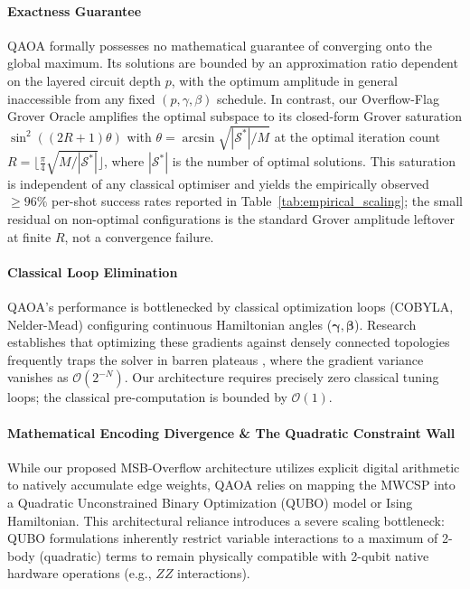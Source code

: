 \documentclass{ieeeaccess}
\begin{document}
\paragraph{Exactness Guarantee}
QAOA formally possesses no mathematical guarantee of converging onto the global maximum. Its solutions are bounded by an approximation ratio dependent on the layered circuit depth $p$, with the optimum amplitude in general inaccessible from any fixed $(p, \gamma, \beta)$ schedule. In contrast, our Overflow-Flag Grover Oracle amplifies the optimal subspace to its closed-form Grover saturation $\sin^2((2R{+}1)\theta)$ with $\theta = \arcsin\sqrt{|\mathcal{S}^*|/M}$ at the optimal iteration count $R = \lfloor \frac{\pi}{4}\sqrt{M / |\mathcal{S}^*|} \rfloor$, where $|\mathcal{S}^*|$ is the number of optimal solutions. This saturation is independent of any classical optimiser and yields the empirically observed $\ge 96\%$ per-shot success rates reported in Table~\ref{tab:empirical_scaling}; the small residual on non-optimal configurations is the standard Grover amplitude leftover at finite $R$, not a convergence failure.

\paragraph{Classical Loop Elimination}
QAOA's performance is bottlenecked by classical optimization loops (COBYLA, Nelder-Mead) configuring continuous Hamiltonian angles ($\boldsymbol{\gamma}, \boldsymbol{\beta}$). Research establishes that optimizing these gradients against densely connected topologies frequently traps the solver in barren plateaus \cite{mcclean2018barren}, where the gradient variance vanishes as $\mathcal{O}(2^{-N})$. Our architecture requires precisely zero classical tuning loops; the classical pre-computation is bounded by $\mathcal{O}(1)$.

\paragraph{Mathematical Encoding Divergence \& The Quadratic Constraint Wall}
While our proposed MSB-Overflow architecture utilizes explicit digital arithmetic to natively accumulate edge weights, QAOA relies on mapping the MWCSP into a Quadratic Unconstrained Binary Optimization (QUBO) model or Ising Hamiltonian. This architectural reliance introduces a severe scaling bottleneck: QUBO formulations inherently restrict variable interactions to a maximum of 2-body (quadratic) terms to remain physically compatible with 2-qubit native hardware operations (e.g., $ZZ$ interactions). 
\end{document}
